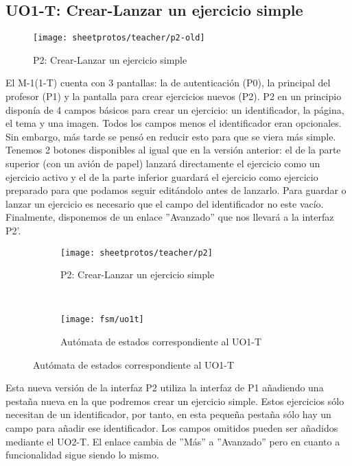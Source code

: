 \subsection{UO1-T: Crear-Lanzar un ejercicio simple}
\label{analisis-de-requisitos:funcionales:uo1t}

\begin{figure}[H]
	\centering
	\texttt{[image: sheetprotos/teacher/p2-old]}
	\caption{P2: Crear-Lanzar un ejercicio simple}
	\label{fig:analisis-de-requisitos:funcionales:uo1t:p2-viejo}
\end{figure}

El M-1(1-T) cuenta con 3 pantallas: la de autenticación (P0), la principal del profesor (P1) y la pantalla para crear ejercicios nuevos (P2). P2 en un principio disponía  de 4 campos básicos para crear un ejercicio: un identificador, la página, el tema y una imagen. Todos los campos menos el identificador eran opcionales. Sin embargo, más tarde se pensó en reducir esto para que se viera más simple.\\

Tenemos 2 botones disponibles al igual que en la versión anterior: el de la parte superior (con un avión de papel) lanzará directamente el ejercicio como un ejercicio activo y el de la parte inferior guardará el ejercicio como ejercicio preparado para que podamos seguir editándolo antes de lanzarlo. Para guardar o lanzar un ejercicio es necesario que el campo del identificador no este vacío. Finalmente, disponemos de un enlace ''Avanzado'' que nos llevará a la interfaz P2'.\\

\begin{figure}[H]
\begin{subfigure}[b]{\textwidth}
	\centering
	\texttt{[image: sheetprotos/teacher/p2]}
	\caption{P2: Crear-Lanzar un ejercicio simple}
	\label{fig:analisis-de-requisitos:funcionales:uo1t:p2}
\end{subfigure}
\\
\begin{subfigure}[b]{\textwidth}
	\centering
	\texttt{[image: fsm/uo1t]}
	\caption{Autómata de estados correspondiente al UO1-T}
	\label{fig:analisis-de-requisitos:funcionales:uo1t:fsm}
\end{subfigure}
\end{figure}

Esta nueva versión de la interfaz P2 utiliza la interfaz de P1 añadiendo una pestaña nueva en la que podremos crear un ejercicio simple. Estos ejercicios sólo necesitan de un identificador, por tanto, en esta pequeña pestaña sólo hay un campo para añadir ese identificador. Los campos omitidos pueden ser añadidos mediante el UO2-T. El enlace cambia de ''Más'' a ''Avanzado'' pero en cuanto a funcionalidad sigue siendo lo mismo.\\

